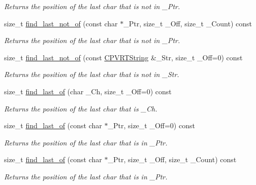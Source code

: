 \begin{DoxyCompactItemize}
\begin{DoxyCompactList}\small\item\em Returns the position of the last char that is not in \+\_\+\+Ptr. \end{DoxyCompactList}\item 
size\+\_\+t \hyperlink{class_c_p_v_r_t_string_a17bbff6a0a2aef72d199fe08e1c9abed}{find\+\_\+last\+\_\+not\+\_\+of} (const char $\ast$\+\_\+\+Ptr, size\+\_\+t \+\_\+\+Off, size\+\_\+t \+\_\+\+Count) const 
\begin{DoxyCompactList}\small\item\em Returns the position of the last char that is not in \+\_\+\+Ptr. \end{DoxyCompactList}\item 
size\+\_\+t \hyperlink{class_c_p_v_r_t_string_ae0eb296ad695900feff7c0dbe095f0f9}{find\+\_\+last\+\_\+not\+\_\+of} (const \hyperlink{class_c_p_v_r_t_string}{C\+P\+V\+R\+T\+String} \&\+\_\+\+Str, size\+\_\+t \+\_\+\+Off=0) const 
\begin{DoxyCompactList}\small\item\em Returns the position of the last char that is not in \+\_\+\+Str. \end{DoxyCompactList}\item 
size\+\_\+t \hyperlink{class_c_p_v_r_t_string_a5559cea254c4d8f06968b13e20ebcadf}{find\+\_\+last\+\_\+of} (char \+\_\+\+Ch, size\+\_\+t \+\_\+\+Off=0) const 
\begin{DoxyCompactList}\small\item\em Returns the position of the last char that is \+\_\+\+Ch. \end{DoxyCompactList}\item 
size\+\_\+t \hyperlink{class_c_p_v_r_t_string_ae8c72833f5430656e8970324b1641c61}{find\+\_\+last\+\_\+of} (const char $\ast$\+\_\+\+Ptr, size\+\_\+t \+\_\+\+Off=0) const 
\begin{DoxyCompactList}\small\item\em Returns the position of the last char that is in \+\_\+\+Ptr. \end{DoxyCompactList}\item 
size\+\_\+t \hyperlink{class_c_p_v_r_t_string_adb9baf66ebeebb6f5953fe2c8c3cceb7}{find\+\_\+last\+\_\+of} (const char $\ast$\+\_\+\+Ptr, size\+\_\+t \+\_\+\+Off, size\+\_\+t \+\_\+\+Count) const 
\begin{DoxyCompactList}\small\item\em Returns the position of the last char that is in \+\_\+\+Ptr. \end{DoxyCompactList}\item 

\end{DoxyCompactItemize}
